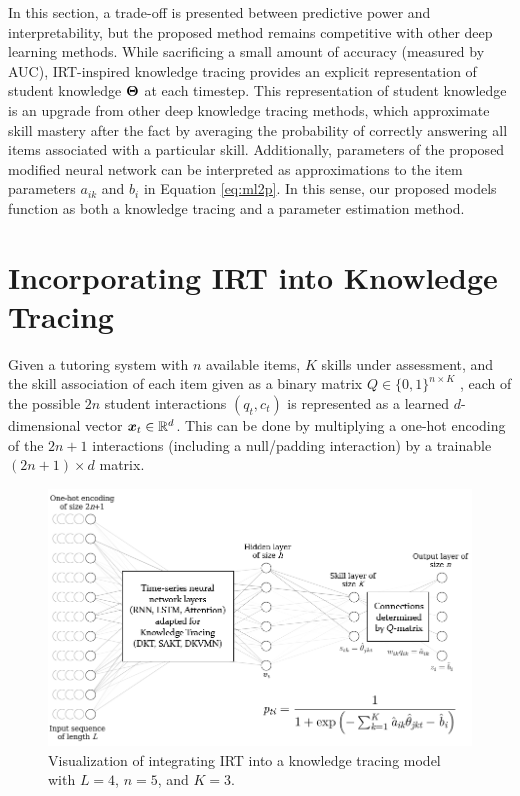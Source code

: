 In this section, a trade-off is presented between predictive power and interpretability, but the proposed method remains competitive with other deep learning methods. While sacrificing a small amount of accuracy (measured by AUC), IRT-inspired knowledge tracing provides an explicit representation of student knowledge $\boldsymbol{\Theta}$ at each timestep. This representation of student knowledge is an upgrade from other deep knowledge tracing methods, which approximate skill mastery after the fact by averaging the probability of correctly answering all items associated with a particular skill. Additionally, parameters of the proposed modified neural network can be interpreted as approximations to the item parameters $a_{ik}$ and $b_i$ in Equation \ref{eq:ml2p}. In this sense, our proposed models function as both a knowledge tracing and a parameter estimation method.


\section{Incorporating IRT into Knowledge Tracing} \label{sec:kt_irt_methods}
Given a tutoring system with $n$ available items, $K$ skills under assessment, and the skill association of each item given as a binary matrix $Q \in \{0,1\}^{n \times K}$ \cite{daSilva2018}, each of the possible $2n$ student interactions $(q_t, c_t)$ is represented as a learned $d$-dimensional vector $\boldsymbol{x}_t \in \mathbb{R}^d$. This can be done by multiplying a one-hot encoding of the $2n+1$ interactions (including a null/padding interaction) by a trainable $(2n+1) \times d$ matrix.

\begin{figure}[h]
  \centering
  \includegraphics[width=.95\textwidth]{img/kt_irt/kt_irt_visual_with_equation_2.png}
  \caption{Visualization of integrating IRT into a knowledge tracing model with $L=4$, $n=5$, and $K=3$.}
  \label{fig:kt_irt_visual}
\end{figure}

